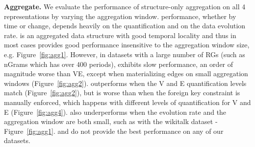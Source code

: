{\bf Aggregate.}  We evaluate the performance of structure-only
aggregation on all 4 representations by varying the aggregation
window.   performance, whether by time or change,
depends heavily on the quantification and on the data evolution rate.
\og is an aggregated data structure with good temporal locality and
thus in most cases provides good performance insensitive to the
aggregation window size, e.g. Figure~\ref{fig:agg1}.  However, in
datasets with a large number of RGs (such as nGrams which has over 400
periods), \og exhibits slow performance, an order of magnitude worse
than VE, except when materializing edges on small aggregation windows
(Figure~\ref{fig:agg2}).  \ve outperforms \og when the V and E
quantification levels match (Figure~\ref{fig:agg2}), but is worse than
\og when the foreign key constraint is manually enforced, which
happens with different levels of quantification for V and E
(Figure~\ref{fig:agg4}).  \ve also underperforms \og
when the evolution rate and the aggregation window are both small,
such as with the wikitalk dataset - Figure~\ref{fig:agg1}.  \sg and
\hg do not provide the best performance on any of our datasets.

